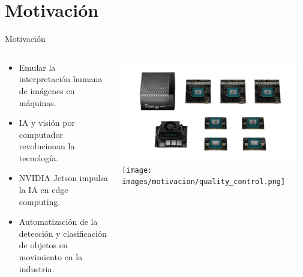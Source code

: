 \documentclass[spanish]{beamer}
\begin{document}
\section{Motivación}
\begin{frame}{Motivación}
    \begin{columns}
        \begin{column}{0.5\textwidth}
                            \begin{itemize}
                                    \item Emular la interpretación humana de imágenes en máquinas.
                                    \item IA y visión por computador revolucionan la tecnología.
                                    \item NVIDIA Jetson impulsa la IA en edge computing.
                                    \item Automatización de la detección y clasificación de objetos en movimiento en la industria.
                            \end{itemize}
                    \end{column}

                    \begin{column}{0.5\textwidth}
                        \includegraphics[width=0.95\textwidth]{images/motivacion/jetson_family.png}
                        \texttt{[image: images/motivacion/quality\_control.png]}
                    \end{column}
    \end{columns}
\end{frame}
\end{document}
